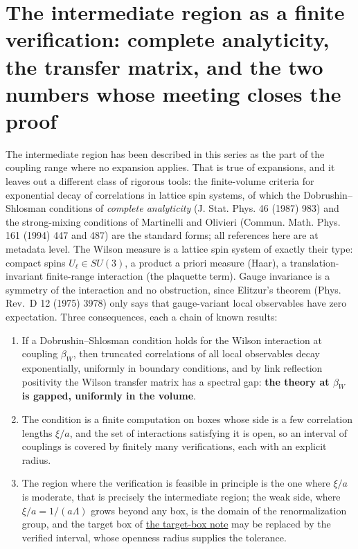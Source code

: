 \documentclass[11pt,a4paper]{article}
\newcommand{\tightlist}{\setlength{\itemsep}{0pt}\setlength{\parskip}{0pt}}
\begin{document}
\section{The intermediate region as a finite verification: complete
analyticity, the transfer matrix, and the two numbers whose meeting
closes the
proof}\label{the-intermediate-region-as-a-finite-verification-complete-analyticity-the-transfer-matrix-and-the-two-numbers-whose-meeting-closes-the-proof}

The intermediate region has been described in this series as the part of
the coupling range where no expansion applies. That is true of
expansions, and it leaves out a different class of rigorous tools: the
finite-volume criteria for exponential decay of correlations in lattice
spin systems, of which the Dobrushin--Shlosman conditions of
\emph{complete analyticity} (J. Stat. Phys. 46 (1987) 983) and the
strong-mixing conditions of Martinelli and Olivieri (Commun. Math. Phys.
161 (1994) 447 and 487) are the standard forms; all references here are
at metadata level. The Wilson measure is a lattice spin system of
exactly their type: compact spins \(U_\ell\in SU(3)\), a product a
priori measure (Haar), a translation-invariant finite-range interaction
(the plaquette term). Gauge invariance is a symmetry of the interaction
and no obstruction, since Elitzur's theorem (Phys. Rev.~D 12 (1975)
3978) only says that gauge-variant local observables have zero
expectation. Three consequences, each a chain of known results:

\begin{enumerate}
\def\labelenumi{\arabic{enumi}.}
\tightlist
\item
  If a Dobrushin--Shlosman condition holds for the Wilson interaction at
  coupling \(\beta_W\), then truncated correlations of all local
  observables decay exponentially, uniformly in boundary conditions, and
  by link reflection positivity the Wilson transfer matrix has a
  spectral gap: \textbf{the theory at \(\beta_W\) is gapped, uniformly
  in the volume}.
\item
  The condition is a finite computation on boxes whose side is a few
  correlation lengths \(\xi/a\), and the set of interactions satisfying
  it is open, so an interval of couplings is covered by finitely many
  verifications, each with an explicit radius.
\item
  The region where the verification is feasible in principle is the one
  where \(\xi/a\) is moderate, that is precisely the intermediate
  region; the weak side, where \(\xi/a=1/(a\Lambda)\) grows beyond any
  box, is the domain of the renormalization group, and the target box of
  \href{strong-coupling-target-box.md}{the target-box note} may be
  replaced by the verified interval, whose openness radius supplies the
  tolerance.
\end{enumerate}
\end{document}
